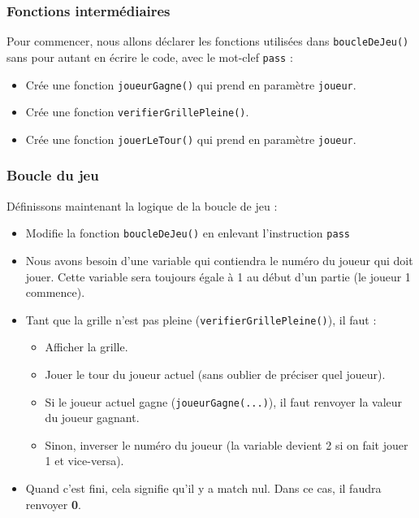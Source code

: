 \documentclass[11pt]{article}
\begin{document}
\subsubsection*{Fonctions intermédiaires}
\label{sec:org5944326}
Pour commencer, nous allons déclarer les fonctions utilisées dans \texttt{boucleDeJeu()} sans pour autant en écrire le code, avec le mot-clef \texttt{pass} :
\begin{itemize}
\item Crée une fonction \texttt{joueurGagne()} qui prend en paramètre \texttt{joueur}.
\item Crée une fonction \texttt{verifierGrillePleine()}.
\item Crée une fonction \texttt{jouerLeTour()} qui prend en paramètre \texttt{joueur}.
\end{itemize}

\subsubsection*{Boucle du jeu}
\label{sec:org9aee9db}
Définissons maintenant la logique de la boucle de jeu :
\begin{itemize}
\item Modifie la fonction \texttt{boucleDeJeu()} en enlevant l'instruction \texttt{pass}
\item Nous avons besoin d'une variable qui contiendra le numéro du joueur qui doit jouer. Cette variable sera toujours égale à 1 au début d'un partie (le joueur 1 commence).
\item Tant que la grille n'est pas pleine (\texttt{verifierGrillePleine()}), il faut :
\begin{itemize}
\item Afficher la grille.
\item Jouer le tour du joueur actuel (sans oublier de préciser quel joueur).
\item Si le joueur actuel gagne (\texttt{joueurGagne(...)}), il faut renvoyer la valeur du joueur gagnant.
\item Sinon, inverser le numéro du joueur (la variable devient 2 si on fait jouer 1 et vice-versa).
\end{itemize}
\item Quand c'est fini, cela signifie qu'il y a match nul. Dans ce cas, il faudra renvoyer \textbf{0}.
\end{itemize}
\end{document}
